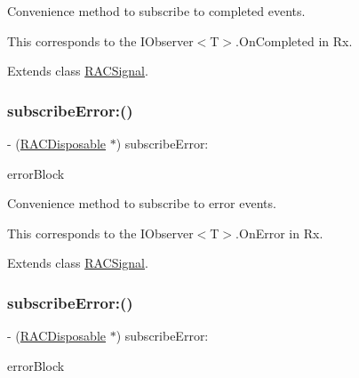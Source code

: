 Convenience method to subscribe to {\ttfamily completed} events.

This corresponds to the {\ttfamily I\+Observer$<$T$>$.On\+Completed} in Rx. 

Extends class \mbox{\hyperlink{interface_r_a_c_signal_a3927c94bfca5db9dad133dd7c45563f3}{R\+A\+C\+Signal}}.

\mbox{\label{category_r_a_c_signal_07_subscription_08_a6e792da9c8499ad5791e14bd126e99cb}} 
\subsubsection{\texorpdfstring{subscribe\+Error\+:()}{subscribeError:()}\hspace{0.1cm}{\footnotesize\ttfamily [1/3]}}
{\footnotesize\ttfamily -\/ (\mbox{\hyperlink{interface_r_a_c_disposable}{R\+A\+C\+Disposable}} $\ast$) subscribe\+Error\+: \begin{DoxyParamCaption}\item[{(void($^\wedge$)(N\+S\+Error $\ast$error))}]{error\+Block }\end{DoxyParamCaption}}

Convenience method to subscribe to {\ttfamily error} events.

This corresponds to the {\ttfamily I\+Observer$<$T$>$.On\+Error} in Rx. 

Extends class \mbox{\hyperlink{interface_r_a_c_signal_a6e792da9c8499ad5791e14bd126e99cb}{R\+A\+C\+Signal}}.

\mbox{\label{category_r_a_c_signal_07_subscription_08_a6e792da9c8499ad5791e14bd126e99cb}} 
\subsubsection{\texorpdfstring{subscribe\+Error\+:()}{subscribeError:()}\hspace{0.1cm}{\footnotesize\ttfamily [2/3]}}
{\footnotesize\ttfamily -\/ (\mbox{\hyperlink{interface_r_a_c_disposable}{R\+A\+C\+Disposable}} $\ast$) subscribe\+Error\+: \begin{DoxyParamCaption}\item[{(void($^\wedge$)(N\+S\+Error $\ast$error))}]{error\+Block }\end{DoxyParamCaption}}

